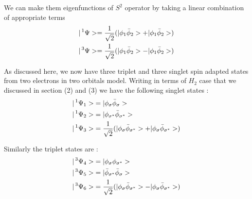 \documentclass[11pt]{article}   	%
\begin{document}
	We can make them eigenfunctions of $S^2$ operator by taking a linear combination of appropriate terms
	\\
	\begin{equation}
	\begin{split}
		|\prescript{1}{}{\Psi}>=\frac{1}{\sqrt{2}}(|\phi_1\bar{\phi}_2>+|\phi_1\bar{\phi}_2>)\\	
		|\prescript{3}{}{\Psi}>=\frac{1}{\sqrt{2}}(|\phi_1\bar{\phi}_2>-|\phi_1\bar{\phi}_2>)\\
	\end{split}
	\end{equation}
	
	As discussed here, we now have three triplet and three singlet spin adapted states 
	from two electrons in two orbitals model. Writing in terms of $H_2$ case that we discussed in 
	section (2) and (3) we have the following singlet states :\\
	\begin{equation}
	\begin{split}
		|\prescript{1}{}{\Psi_1}>&=|\phi_{\sigma}\bar{\phi}_{\sigma}>\\
		|\prescript{1}{}{\Psi_2}>&=|\phi_{\sigma^*}\bar{\phi}_{\sigma^*}>\\
		|\prescript{1}{}{\Psi_3}>&=\frac{1}{\sqrt{2}}(|\phi_{\sigma}\bar{\phi}_{\sigma^*}>+
		|\phi_{\sigma}\bar{\phi}_{\sigma^*}>)\\	
	\end{split}
	\end{equation}
	
	Similarly the triplet states are :\\
	\begin{equation}
	\begin{split}
		|\prescript{3}{}{\Psi_4}>&=|\phi_{\sigma}\phi_{\sigma^*}>\\
		|\prescript{3}{}{\Psi_5}>&=|\bar{\phi}_{\sigma^*}\bar{\phi}_{\sigma}>\\
		|\prescript{3}{}{\Psi_6}>&=\frac{1}{\sqrt{2}}(|\phi_{\sigma}\bar{\phi}_{\sigma^*}>-
		|\phi_{\sigma}\bar{\phi}_{\sigma^*}>)\\
	\end{split}
	\end{equation}
\end{document}

